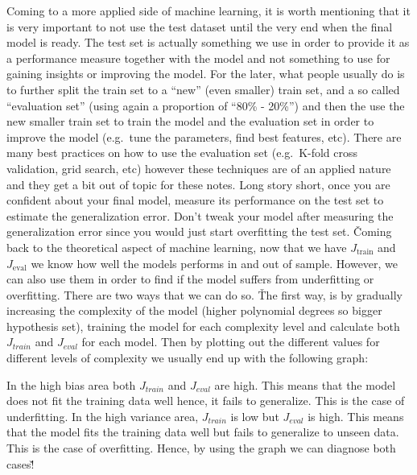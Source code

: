Coming to a more applied side of machine learning, it is worth mentioning that it is very important to not use the
test dataset until the very end when the final model is ready. The test set is actually something we use in order to
provide it as a performance measure together with the model and not something to use for gaining insights or
improving the model. For the later, what people usually do is to further split the train set to a ``new'' (even
smaller) train set, and a so called ``evaluation set'' (using again a proportion of ``80\% - 20\%'') and then the
use the new smaller train set to train the model and the evaluation set in order to improve the model (e.g.\ tune the
parameters, find best features, etc). There are many best practices on how to use the evaluation set (e.g.\ K-fold
cross validation, grid search, etc) however these techniques are of an applied nature and they get a bit out of topic
for these notes. Long story short, once you are confident about your final model, measure its performance on the test
set to estimate the generalization error. Don't tweak your model after measuring the generalization error since you
would just start overfitting the test set. \v

Coming back to the theoretical aspect of machine learning, now that we have $J_{\text{train}} $ and $J_{\text{eval}}
$ we know how well the models performs in and out of sample. However, we can also use them in order to find if the
model suffers from underfitting or overfitting. There are two ways that we can do so. \v

The first way, is by gradually increasing the complexity of the model (higher polynomial degrees so bigger hypothesis
set), training the model for each complexity level and calculate both $J_{train}$ and $J_{eval}$ for each model. Then
by plotting out the different values for different levels of complexity we usually end up with the following graph:

\vspace{-10pt}


\vspace{-10pt}

In the high bias area both $J_{train}$ and $J_{eval}$ are high. This means that the model does not fit the training
data well hence, it fails to generalize. This is the case of underfitting. In the high variance area, $J_{train}$ is
low but $J_{eval}$ is high. This means that the model fits the training data well but fails to generalize to unseen
data. This is the case of overfitting. Hence, by using the graph we can diagnose both cases!\v

